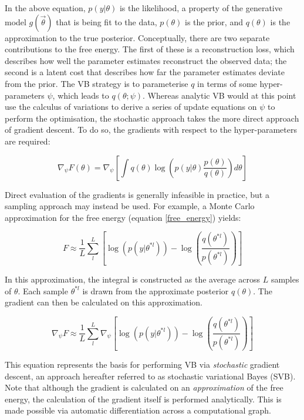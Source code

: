 In the above equation, $p(y|\theta)$ is the likelihood, a property of the generative model $g(\vec{\theta})$ that is being fit to the data, $p(\theta)$ is the prior, and $q(\theta)$ is the approximation to the true posterior. Conceptually, there are two separate contributions to the free energy. The first of these is a reconstruction loss, which describes how well the parameter estimates reconstruct the observed data; the second is a latent cost that describes how far the parameter estimates deviate from the prior. The VB strategy is to parameterise $q$ in terms of some hyper-parameters $\psi$, which leads to $q(\theta; \psi)$. Whereas analytic VB would at this point use the calculus of variations to derive a series of update equations on $\psi$ to perform the optimisation, the stochastic approach takes the more direct approach of gradient descent. To do so, the gradients with respect to the hyper-parameters are required: 

\begin{equation}
\nabla_{\psi} F(\theta) = \nabla_{\psi} \left[ \int q(\theta) \log \left( p(y|\theta) \frac{p(\theta)}{q(\theta)} \right) d\theta \right]
\end{equation}

Direct evaluation of the gradients is generally infeasible in practice, but a sampling approach may instead be used. For example, a Monte Carlo approximation for the free energy (equation \ref{free_energy}) yields: 

\begin{equation}
\label{free_energy_approx}
F \approx \frac{1}{L} \sum^{L}_{l} \left[ \log( p(y|\theta^{*l}) ) - \log \left( \frac{q(\theta^{*l})}{p(\theta^{*l})} \right) \right]
\end{equation}

In this approximation, the integral is constructed as the average across $L$ samples of $\theta$. Each sample $\theta^{*l}$ is drawn from the approximate posterior $q(\theta)$. The gradient can then be calculated on this approximation. 

\begin{equation}
\nabla_{\psi} F \approx \frac{1}{L} \sum^{L}_{l} \nabla_{\psi} \left[ \log( p(y|\theta^{*l}) ) - \log \left( \frac{q(\theta^{*l})}{p(\theta^{*l})} \right) \right]
\end{equation}

This equation represents the basis for performing VB via \textit{stochastic} gradient descent, an approach hereafter referred to as stochastic variational Bayes (SVB). Note that although the gradient is calculated on an \textit{approximation} of the free energy, the calculation of the gradient itself is performed analytically. This is made possible via automatic differentiation across a computational graph. 

